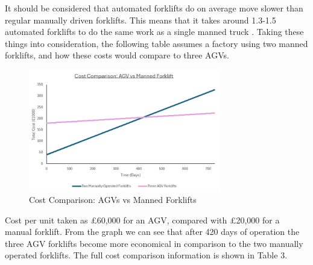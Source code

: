 \documentclass[12pt]{article}
\begin{document}
It should be considered that automated forklifts do on average move slower than regular manually driven forklifts. This means that it takes around 1.3-1.5 automated forklifts to do the same work as a single manned truck \cite{Pastor-Tella2024}. 
Taking these things into consideration, the following table assumes a factory using two manned forklifts, and how these costs would compare to three AGVs.
 

\begin{figure}[h!]
    \centering
     \includegraphics[width=0.75\textwidth]{CostComparisonGraphUpdatedV2.png}
        \caption{Cost Comparison: AGVs vs Manned Forklifts}
         \label{fig:timeline}
\end{figure}
\FloatBarrier
Cost per unit taken as £60,000 for an AGV, compared with £20,000 for a manual forklift. From the graph we can see that after 420 days of operation the three AGV forklifts become more economical in comparison to the two manually operated forklifts. The full cost comparison information is shown in Table 3.
\end{document}
